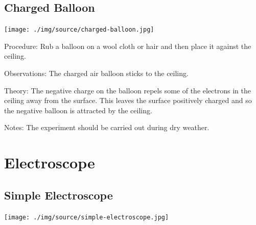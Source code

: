 \begin{multicols}{2}
\subsection{Charged Balloon}

\begin{center}
\texttt{[image: ./img/source/charged-balloon.jpg]}
\end{center}

\begin{description*}
\item[Procedure:]{Rub a balloon on a wool cloth or hair and then place it against the ceiling.}
\item[Observations:]{The charged air balloon sticks to the ceiling.}
\item[Theory:]{The negative charge on the balloon repels some of the electrons in
the ceiling away from the surface. This leaves the surface positively charged and so the
negative balloon is attracted by the ceiling.}
\item[Notes:]{The experiment should be carried out during dry weather.}
\end{description*}


\section*{Electroscope}


\subsection{Simple Electroscope}

\begin{center}
\texttt{[image: ./img/source/simple-electroscope.jpg]}
\end{center}


\end{multicols}
